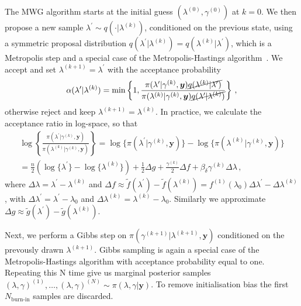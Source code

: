 The MWG algorithm starts at the initial guess $( \lambda^{(0)} , \gamma^{(0)}  )$ at $k=0$. We then propose a new sample $\lambda^{\prime} \sim q(\cdot |  \lambda^{(k)})$, conditioned on the previous state, using a symmetric proposal distribution $q(\lambda^{\prime} |  \lambda^{(k)}) = q(\lambda^{(k)} |  \lambda^{\prime})$, which is a Metropolis step and a special case of the Metropolis-Hastings algorithm~\cite{roberts2006harris}.
We accept and set $\lambda^{(k+1)} = \lambda^{\prime}$ with the acceptance probability
\begin{align}
\alpha( \lambda^{\prime} | \lambda^{(k)}) = \min \left\{ 1, \frac{\pi(\lambda^{\prime}  | \gamma^{(k)}, \bm{y}) \cancel{q(\lambda^{(k)} | \lambda^{\prime} ) } }{\pi(\lambda^{(k)} | \gamma^{(k)}, \bm{y}) \cancel{q(\lambda^{\prime} | \lambda^{(k)})} } \right\} \, ,
\end{align}
otherwise reject and keep $\lambda^{(k+1)} = \lambda^{(k)}$.
In practice, we calculate the acceptance ratio in log-space, so that
\begin{align} 
	\log \left\{ \frac{\pi(\lambda^{\prime} | \gamma^{(k)}, \bm{y})  }{\pi(\lambda^{(k)}| \gamma^{(k)}, \bm{y})}  \right\} 
	= \log  \{\pi(\lambda^{\prime} | \gamma^{(k)}, \bm{y} ) \}  -\log  \{ \pi(\lambda^{(k)}| \gamma^{(k)}, \bm{y}) \} \\
	= \frac{n}{2} (\log\{\lambda^{\prime}\} - \log\{\lambda^{(k)}\} ) + \frac{1}{2} \Delta g + \frac{\gamma^{(k)}}{2} \Delta f  + \beta_\delta \gamma^{(k)} \Delta \lambda  \, ,
\end{align}
where $\Delta \lambda = \lambda^{\prime} - \lambda^{(k)} $ and  $\Delta f \approx  \tilde{f} (\lambda^\prime) - \tilde{f}(\lambda^{(k)}) =   f^{(1)}(\lambda_0) \Delta \lambda^\prime- \Delta \lambda^{(k)} $, with  $\Delta \lambda^{\prime} = \lambda^\prime - \lambda_0 $ and $\Delta \lambda^{(k)} =  \lambda^{(k)} - \lambda_0$.
Similarly we approximate $\Delta g \approx \tilde{g}(\lambda^{\prime}) -\tilde{g}(\lambda^{(k)})$.

Next, we perform a Gibbs step on $\pi(	\gamma^{(k+1)} |  \lambda^{(k+1)}, \bm{y}) $ conditioned on the prevously drawn $ \lambda^{(k+1)}$.
Gibbs sampling is again a special case of the Metropolis-Hastings algorithm with  acceptance probability equal to one.
Repeating this N time give us marginal posterior samples $(\lambda, \gamma)^{(1)}, \dots, (\lambda, \gamma)^{(N)} \sim  \pi(\lambda, \gamma| \bm{y})$.
To remove initialisation bias the first $N_{\text{burn-in}}$ samples are discarded.


